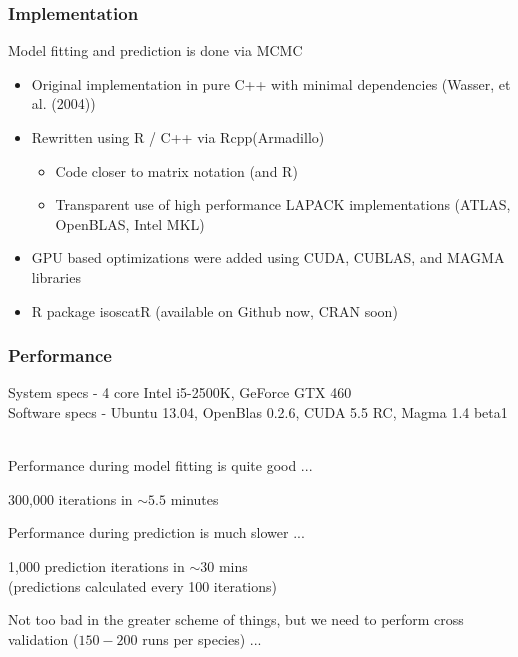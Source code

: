 \documentclass{beamer}
\begin{document}
\begin{frame}
\frametitle{Implementation}

Model fitting and prediction is done via MCMC \\
\begin{itemize} \addtolength{\itemsep}{3mm}
\item Original implementation in pure C++ with minimal dependencies (Wasser, et al. (2004))
\item Rewritten using R / C++ via Rcpp(Armadillo) 
\begin{itemize}
\item Code closer to matrix notation (and R)
\item Transparent use of high performance LAPACK implementations (ATLAS, OpenBLAS, Intel MKL)
\end{itemize}
\item GPU based optimizations were added using CUDA, CUBLAS, and MAGMA libraries
\item R package isoscatR (available on Github now, CRAN soon)
\end{itemize}

\end{frame}



\begin{frame}
\frametitle{Performance}

{\small System specs - 4 core Intel i5-2500K, GeForce GTX 460} \\
{\small Software specs - Ubuntu 13.04, OpenBlas 0.2.6, CUDA 5.5 RC, Magma 1.4 beta1} \\
~\\
\pause

Performance during model fitting is quite good ... \\

\begin{center}
300,000 iterations in $\sim 5.5$ minutes
\end{center}

\pause 

Performance during prediction is much slower ... \\
\begin{center}
1,000 prediction iterations in $\sim 30$ mins \\
(predictions calculated every 100 iterations)
\end{center}

\pause

Not too bad in the greater scheme of things, but we need to perform cross validation ($150-200$ runs per species) ...

\end{frame}
\end{document}
